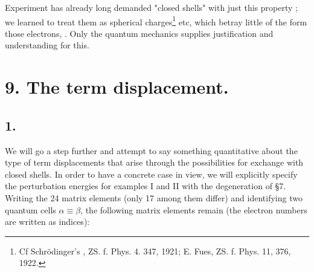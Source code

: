 \begin{paper}{1}
Experiment has already long demanded "closed shells" with just this property ; we learned to treat them as spherical charges\footnote{Cf Schr\"odinger's , ZS. f. Phys. 4. 347, 1921; E. Fues, ZS. f. Phys. 11, 376, 1922.} etc, which betray little of the form those electrons, . Only the quantum mechanics supplies justification and understanding for this.

\section*{9. The term displacement.}
\subsection*{1.} We will go a step further and attempt to say something quantitative about the type of term displacements that arise through the possibilities for exchange with closed shells. In order to have a concrete case in view, we will explicitly specify the perturbation energies for examples I and II with the degeneration of \S7. Writing the 24 matrix elements (only 17 among them differ) and identifying two quantum cells $\alpha\equiv\beta$, the following matrix elements remain (the electron numbers are written as indices):


\end{paper}

